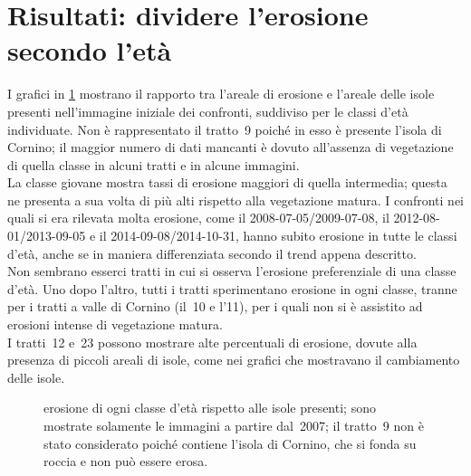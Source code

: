 \section{Risultati: dividere l'erosione secondo l'età}
I grafici in \cref{graph:erosione-classi-eta} mostrano il rapporto tra l'areale di erosione e l'areale delle isole presenti nell'immagine iniziale dei confronti, suddiviso per le classi d'età individuate.
Non è rappresentato il tratto~9 poiché in esso è presente l'isola di Cornino; il maggior numero di dati mancanti è dovuto all'assenza di vegetazione di quella classe in alcuni tratti e in alcune immagini.
\\
La classe giovane mostra tassi di erosione maggiori di quella intermedia; questa ne presenta a sua volta di più alti rispetto alla vegetazione matura.
I confronti nei quali si era rilevata molta erosione, come il 2008-07-05/2009-07-08, il 2012-08-01/2013-09-05 e il 2014-09-08/2014-10-31, hanno subito erosione in tutte le classi d'età, anche se in maniera differenziata secondo il trend appena descritto.
\\
Non sembrano esserci tratti in cui si osserva l'erosione preferenziale di una classe d'età. Uno dopo l'altro, tutti i tratti sperimentano erosione in ogni classe, tranne per i tratti a valle di Cornino (il~10 e l'11), per i quali non si è assistito ad erosioni intense di vegetazione matura.
\\
I tratti~12 e~23 possono mostrare alte percentuali di erosione, dovute alla presenza di piccoli areali di isole, come nei grafici che mostravano il cambiamento delle isole.
%
\begin{landscape}
\begin{figure}
	\centering
	
	\caption[erosione di ogni classe d'età rispetto alle isole presenti]{erosione di ogni classe d'età rispetto alle isole presenti; sono mostrate solamente le immagini a partire dal~2007; il tratto~9 non è stato considerato poiché contiene l'isola di Cornino, che si fonda su roccia e non può essere erosa.}
	\label{graph:erosione-classi-eta}
\end{figure}
\end{landscape}
%

